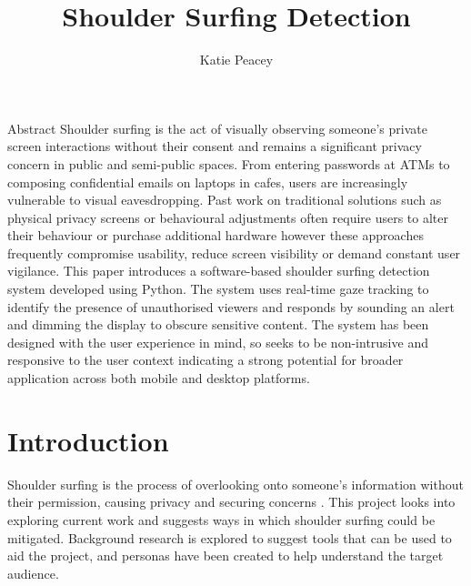 \documentclass[12pt]{article}
\title{ Shoulder Surfing Detection}
\author{Katie Peacey}
\theoremstyle{plain}
\theoremstyle{definition}
\begin{document}

\maketitle
\studentdeclarations

\begin{frontmatterparagraph}{Abstract}
Shoulder surfing is the act of visually observing someone’s private screen interactions without their consent and remains a significant privacy concern in public and semi-public spaces. From entering passwords at ATMs to composing confidential emails on laptops in cafes, users are increasingly vulnerable to visual eavesdropping. Past work on traditional solutions such as physical privacy screens or behavioural adjustments often require users to alter their behaviour or purchase additional hardware however these approaches frequently compromise usability, reduce screen visibility or demand constant user vigilance. This paper introduces a software-based shoulder surfing detection system developed using Python. The system uses real-time gaze tracking to identify the presence of unauthorised viewers and responds by sounding an alert and dimming the display to obscure sensitive content. The system has been designed  with the user experience in mind, so seeks to be non-intrusive and responsive to the user context indicating a strong potential for broader application across both mobile and desktop platforms.
\end{frontmatterparagraph}

\tableofcontents

\listoffigures
\listoftables
\clearpage


\section{Introduction}
\label{sec:intro}

Shoulder surfing is the process of overlooking onto someone’s information without their permission, causing privacy and securing concerns \cite{eiband_understanding_2017}. This project looks into exploring current work and suggests ways in which shoulder surfing could be mitigated. Background research is explored to suggest tools that can be used to aid the project, and personas have been created to help understand the target audience.
\end{document}
